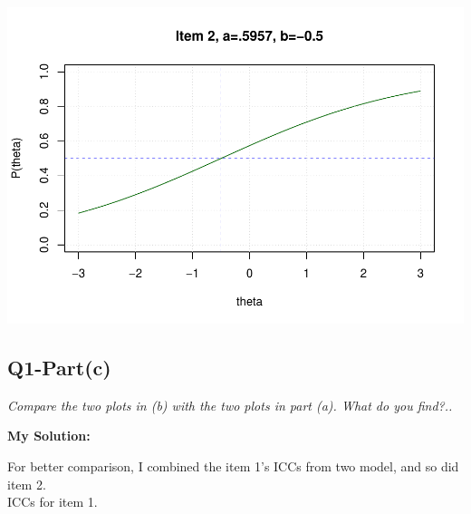 \documentclass[
]{article}
\begin{document}
\includegraphics{Assignment_1_files/figure-latex/unnamed-chunk-6-1.pdf}

\hypertarget{q1-partc}{%
\subsection{Q1-Part(c)}\label{q1-partc}}

\emph{Compare the two plots in (b) with the two plots in part (a). What
do you find?..}

\textbf{My Solution: }

For better comparison, I combined the item 1's ICCs from two model, and
so did item 2.\\
ICCs for item 1.
\end{document}
